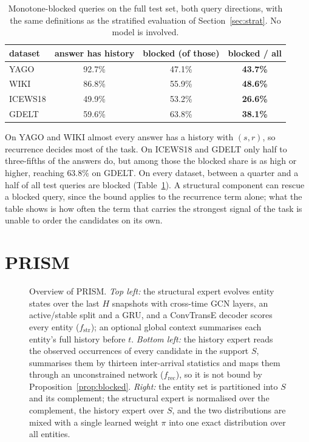 \documentclass[conference]{IEEEtran}
\begin{document}
\begin{table}[t]
\centering
\caption{Monotone-blocked queries on the full test set, both query
directions, with the same definitions as the stratified evaluation of
Section~\ref{sec:strat}. No model is involved.}
\label{tab:blocked}
\begin{tabular}{lccc}
\toprule
dataset & answer has history & blocked (of those) & blocked / all \\
\midrule
YAGO    & 92.7\% & 47.1\% & \textbf{43.7\%} \\
WIKI    & 86.8\% & 55.9\% & \textbf{48.6\%} \\
ICEWS18 & 49.9\% & 53.2\% & \textbf{26.6\%} \\
GDELT   & 59.6\% & 63.8\% & \textbf{38.1\%} \\
\bottomrule
\end{tabular}
\end{table}

On YAGO and WIKI almost every answer has a history with $(s,r)$, so
recurrence decides most of the task. On ICEWS18 and GDELT only half to
three-fifths of the answers do, but among those the blocked share is as high
or higher, reaching $63.8\%$ on GDELT. On every dataset, between a quarter and
a half of all test queries are blocked (Table~\ref{tab:blocked}). A structural component can rescue a blocked
query, since the bound applies to the recurrence term alone; what the table
shows is how often the term that carries the strongest signal of the task is
unable to order the candidates on its own.

\section{PRISM}
\label{sec:method}

\begin{figure}[t]
\centering

\caption{Overview of PRISM. \emph{Top left:} the structural expert evolves
entity states over the last $H$ snapshots with cross-time GCN layers, an
active/stable split and a GRU, and a ConvTransE decoder scores every entity
($f_{\mathrm{str}}$); an optional global context summarises each entity's
full history before $t$. \emph{Bottom left:} the history expert reads the
observed occurrences of every candidate in the support $S$, summarises them by
thirteen inter-arrival statistics and maps them through an unconstrained
network ($f_{\mathrm{rec}}$), so it is not bound by
Proposition~\ref{prop:blocked}. \emph{Right:} the entity set is partitioned
into $S$ and its complement; the structural expert is normalised over the
complement, the history expert over $S$, and the two distributions are mixed
with a single learned weight $\pi$ into one exact distribution over all
entities.}
\label{fig:arch}
\end{figure}
\end{document}
